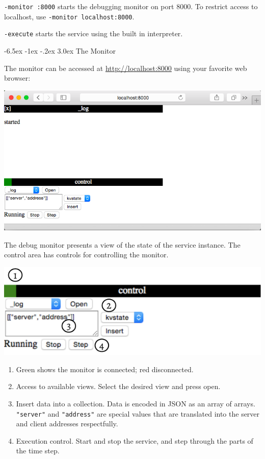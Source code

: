 \documentclass[a5paper,12pt,onecolumn]{article}
\makeatletter
\def\code#1{\mbox{\lstinline{#1}}}
\renewcommand\section{\@startsection {section}{1}{\z@}%
	{-6.5ex \@plus -1ex \@minus -.2ex}%
	{3.0ex}%
	{\sf\Large}}
\makeatother
\begin{document}
\code{-monitor :8000} starts the debugging monitor on port 8000. To restrict access to localhost, use \code{-monitor localhost:8000}.

\code{-execute} starts the service using the built in interpreter.

\section{The Monitor}

The monitor can be accessed at \url{http://localhost:8000} using your favorite web browser:

\includegraphics{start/monitor.png}

The debug monitor presents a view of the state of the service instance. The control area has controls for controlling the monitor.

\includegraphics{start/control}

\begin{enumerate}
\item Green shows the monitor is connected; red disconnected.
\item Access to available views. Select the desired view and press open.
\item Insert data into a collection. Data is encoded in JSON as an array of arrays. \code{"server"} and \code{"address"} are special values that are translated into the server and client addresses respectfully.
\item Execution control. Start and stop the service, and step through the parts of the time step.
\end{enumerate}
\end{document}
